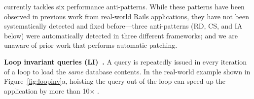 \label{sec:reveal}
\Tool currently tackles six performance anti-patterns.
While these patterns have been observed in previous work
\cite{yan:cikm17, junwen:icse2018, chen2016finding}
from real-world %
Rails applications, they have
not been systematically detected and fixed before---three anti-patterns
(RD, CS, and IA below) were automatically detected in three different frameworks; and we are unaware of prior work that performs automatic patching.



\textbf{Loop invariant queries (LI)~\cite{junwen:icse2018}.} A query is repeatedly
issued in every iteration of a loop to load the \textit{same} database contents.  %
In the real-world example shown in 
Figure~\ref{fig:loopinv}a, hoisting the query out of the loop can speed up the 
application by more than 10$\times$ \cite{redmine23334}. 





